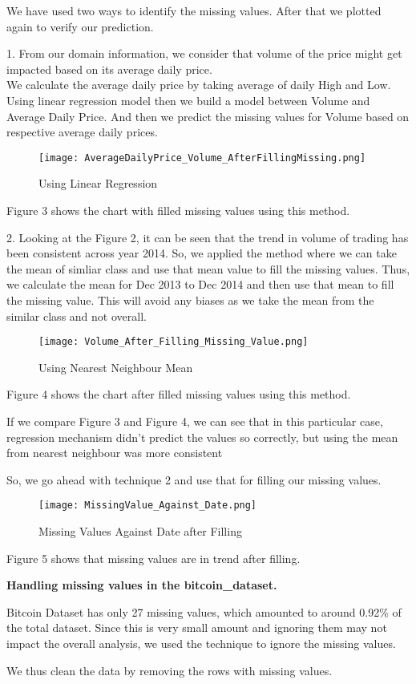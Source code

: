 \documentclass{article}
\begin{document}
We have used two ways to identify the missing values. After that we plotted again to verify our prediction.

1. From our domain information, we consider that volume of the price might get impacted based on its average daily price.\\

We calculate the average daily price by taking average of daily High and Low. Using linear regression model then we build a model between Volume and Average Daily Price. And then we predict the missing values for Volume based on respective average daily prices.\\

\begin{figure}
    \centering
    \texttt{[image: AverageDailyPrice\_Volume\_AfterFillingMissing.png]}
    \caption{Using Linear Regression}
    \label{fig:my_label}
\end{figure}

Figure 3 shows the chart with filled missing values using this method.

2. Looking at the Figure 2, it can be seen that the trend in volume of trading has been consistent across year 2014. So, we applied the method where we can take the mean of simliar class and use that mean value to fill the missing values.
Thus, we calculate the mean for Dec 2013 to Dec 2014 and then use that mean to fill the missing value.
This will avoid any biases as we take the mean from the similar class and not overall.

\begin{figure}
    \centering
    \texttt{[image: Volume\_After\_Filling\_Missing\_Value.png]}
    \caption{Using Nearest Neighbour Mean}
    \label{fig:my_label}
\end{figure}


Figure 4 shows the chart after filled missing values using this method.

If we compare Figure 3 and Figure 4, we can see that in this particular case, regression mechanism
didn't predict the values so correctly, but using the mean from nearest neighbour was more consistent

So, we go ahead with technique 2 and use that for filling our missing values.

\begin{figure}
    \centering
    \texttt{[image: MissingValue\_Against\_Date.png]}
    \caption{Missing Values Against Date after Filling}
    \label{fig:my_label}
\end{figure}

Figure 5 shows that missing values are in trend after filling.\newline

\textbf{Handling missing values in the bitcoin\_dataset.}

Bitcoin Dataset has only 27 missing values, which amounted to around 0.92\% of the total
dataset. Since this is very small amount and ignoring them may not impact the overall analysis, we used
the technique to ignore the missing values.

We thus clean the data by removing the rows with missing values.
\end{document}
